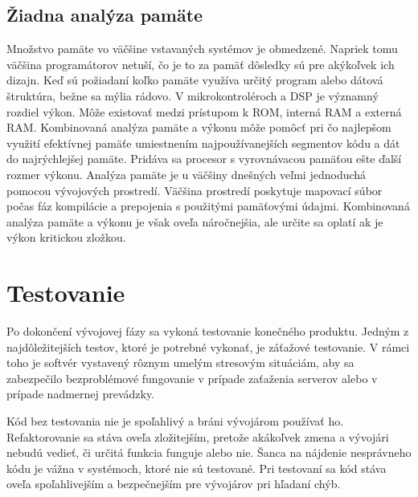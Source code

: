 \documentclass[10pt,twoside,slovak,a4paper]{article}
\begin{document}
\subsection{Žiadna analýza pamäte}
Množstvo pamäte vo väčšine vstavaných systémov je obmedzené. Napriek tomu väčšina programátorov netuší, čo je to za pamäť
dôsledky sú pre akýkoľvek ich dizajn. Keď sú požiadaní koľko pamäte využíva určitý program alebo dátová štruktúra, bežne sa mýlia rádovo.
V mikrokontroléroch a DSP je významný rozdiel výkon. Môže existovať medzi prístupom k ROM, interná
RAM a externá RAM. Kombinovaná analýza pamäte a výkonu môže pomôcť pri čo najlepšom využití efektívnej pamäťe umiestnením najpoužívanejších segmentov kódu a dát do najrýchlejšej pamäte. Pridáva sa procesor s vyrovnávacou pamäťou ešte ďalší rozmer výkonu.
Analýza pamäte je u väčšiny dnešných veľmi jednoduchá pomocou vývojových prostredí. Väčšina prostredí poskytuje mapovací súbor počas fáz kompilácie a prepojenia s použitými pamäťovými údajmi. Kombinovaná analýza pamäte a výkonu je však oveľa náročnejšia, ale určite sa oplatí ak je 
výkon kritickou zložkou.\cite{25mistakes}










\section{Testovanie}
Po dokončení vývojovej fázy sa vykoná testovanie konečného produktu. Jedným z najdôležitejších testov, ktoré je potrebné vykonať, je záťažové testovanie. V rámci toho je softvér vystavený rôznym umelým stresovým situáciám, aby sa zabezpečilo bezproblémové fungovanie v prípade zaťaženia serverov alebo v prípade nadmernej prevádzky.

Kód bez testovania nie je spoľahlivý a bráni vývojárom používať ho. Refaktorovanie sa stáva oveľa zložitejším, pretože akákoľvek zmena a vývojári nebudú vedieť, či určitá funkcia funguje alebo nie. Šanca na nájdenie nesprávneho kódu je vážna v systémoch, ktoré nie sú testované. Pri testovaní sa kód stáva oveľa spoľahlivejším a bezpečnejším pre vývojárov pri hľadaní chýb.
\end{document}
